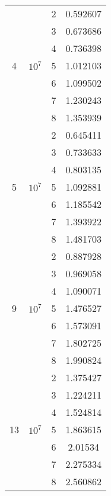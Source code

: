 \begin{longtable}{|c|c|c|c|}
	\multirow{7}{*}{4} & \multirow{7}{*}{$10^7$} & 2 &  0.592607 \\ \cline{3-4}
	& & 3    &	0.673686  \\ \cline{3-4}
	& & 4   &	0.736398  \\ \cline{3-4}
	& & 5    &	1.012103 \\ \cline{3-4}
	& & 6     &	1.099502  \\ \cline{3-4}
	& & 7    & 1.230243  \\ \cline{3-4}
	& & 8   & 1.353939  \\ \cline{3-4}
    \hline
	\multirow{7}{*}{5} & \multirow{7}{*}{$10^7$} & 2 &  0.645411 \\ \cline{3-4}
	& & 3    &	0.733633  \\ \cline{3-4}
	& & 4   &	0.803135  \\ \cline{3-4}
	& & 5    &	1.092881 \\ \cline{3-4}
	& & 6     &	1.185542  \\ \cline{3-4}
	& & 7    & 1.393922  \\ \cline{3-4}
	& & 8   & 1.481703  \\ \cline{3-4}
	\hline
	\multirow{7}{*}{9} & \multirow{7}{*}{$10^7$} & 2 &  0.887928 \\ \cline{3-4}
	& & 3    &	0.969058  \\ \cline{3-4}
	& & 4   &	1.090071  \\ \cline{3-4}
	& & 5    &	1.476527 \\ \cline{3-4}
	& & 6     &	1.573091 \\ \cline{3-4}
	& & 7    & 1.802725  \\ \cline{3-4}
	& & 8   & 1.990824  \\ \cline{3-4}
	\hline
	\multirow{7}{*}{13} & \multirow{7}{*}{$10^7$} & 2 &  1.375427 \\ \cline{3-4}
	& & 3    &	1.224211  \\ \cline{3-4}
	& & 4   &	1.524814  \\ \cline{3-4}
	& & 5    &	1.863615 \\ \cline{3-4}
	& & 6     &	2.01534 \\ \cline{3-4}
	& & 7    & 2.275334  \\ \cline{3-4}
	& & 8   & 2.560862  \\ \cline{3-4}
	\hline
\end{longtable}

